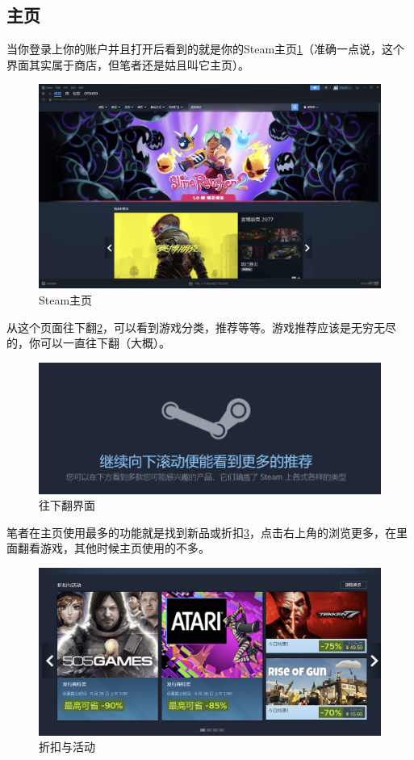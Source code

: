 \documentclass{article}
\begin{document}
    \subsection{主页}
    当你登录上你的账户并且打开后看到的就是你的Steam主页\ref{fig:Steam主页}（准确一点说，这个界面其实属于商店，但笔者还是姑且叫它主页）。
    \begin{figure}[H]
    \centering
    \includegraphics[width=0.7\linewidth]{图/Steam主页.png}
    \caption{\label{fig:Steam主页}Steam主页}
    \end{figure}
    从这个页面往下翻\ref{fig:往下翻}，可以看到游戏分类，推荐等等。游戏推荐应该是无穷无尽的，你可以一直往下翻（大概）。
    \begin{figure}[H]
    \centering
    \includegraphics[width=0.7\linewidth]{图/往下翻.png}
    \caption{\label{fig:往下翻}往下翻界面}
    \end{figure}
    笔者在主页使用最多的功能就是找到新品或折扣\ref{fig:折扣与活动}，点击右上角的浏览更多，在里面翻看游戏，其他时候主页使用的不多。
    \begin{figure}[H]
    \centering
    \includegraphics[width=0.7\linewidth]{图/折扣与活动.png}
    \caption{\label{fig:折扣与活动}折扣与活动}
    \end{figure}
    
\end{document}
